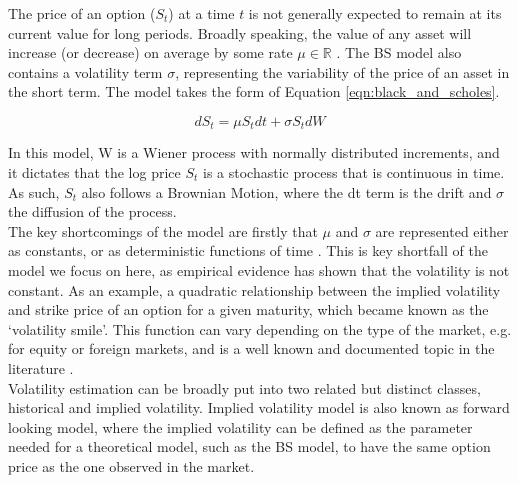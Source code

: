 \documentclass[12pt,oneside]{article}
\begin{document}
The price of an option ($S_t$) at a time $t$ is not generally expected to remain at its current value for long periods. Broadly speaking, the value of any asset will increase (or decrease) on average by some rate $\mu\in\mathbb{R}$%
. The BS model also contains a volatility term $\sigma$, representing the variability of the price of an asset in the short term. The model takes the form of Equation \ref{eqn:black_and_scholes}.

\begin{equation}
\label{eqn:black_and_scholes} 
dS_t=\mu S_t dt + \sigma S_t dW
\end{equation}

In this model, W is a Wiener process with normally distributed increments, and it dictates that the log price $S_t$ is a stochastic process that is continuous in time. As such, $S_t$ also follows a Brownian Motion, where the dt term is the drift and $\sigma$ the diffusion of the process. 
\\

The key shortcomings of the model are firstly that $\mu$ and $\sigma$ are represented either as constants, or as deterministic functions of time \cite{BlackScholes1973, Gatheral2014}. This is key shortfall of the model we focus on here, as empirical evidence has shown that the volatility is not constant. As an example, a quadratic  relationship between the implied volatility and strike price of an option for a given maturity, which became known as the `volatility smile'. This function can vary depending on the type of the market, e.g. for equity or foreign markets, and is a well known and documented topic in the literature \cite{Hull2015}.
\\

Volatility estimation can be broadly put into two related but distinct classes, historical and implied volatility. Implied volatility model is also known as forward looking model, where the implied volatility can be defined as the parameter needed for a theoretical model, such as the BS model, to have the same option price as the one observed in the market.
\\
\end{document}
